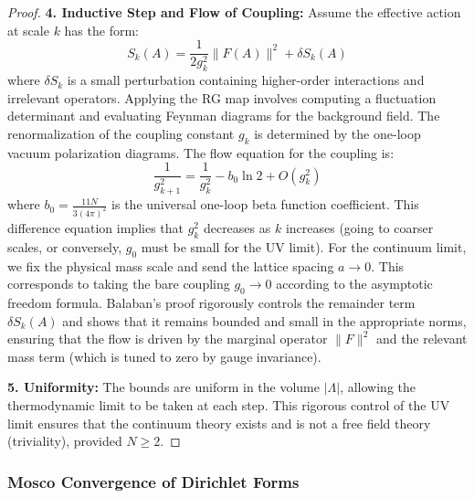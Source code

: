 \begin{proof}
\textbf{4. Inductive Step and Flow of Coupling:}
Assume the effective action at scale $k$ has the form:
\begin{equation}
S_k(A) = \frac{1}{2g_k^2} \|F(A)\|^2 + \delta S_k(A)
\end{equation}
where $\delta S_k$ is a small perturbation containing higher-order interactions and irrelevant operators.
Applying the RG map involves computing a fluctuation determinant and evaluating Feynman diagrams for the background field.
The renormalization of the coupling constant $g_k$ is determined by the one-loop vacuum polarization diagrams.
The flow equation for the coupling is:
\begin{equation}
\frac{1}{g_{k+1}^2} = \frac{1}{g_k^2} - b_0 \ln 2 + O(g_k^2)
\end{equation}
where $b_0 = \frac{11N}{3(4\pi)^2}$ is the universal one-loop beta function coefficient.
This difference equation implies that $g_k^2$ decreases as $k$ increases (going to coarser scales, or conversely, $g_0$ must be small for the UV limit).
For the continuum limit, we fix the physical mass scale and send the lattice spacing $a \to 0$. This corresponds to taking the bare coupling $g_0 \to 0$ according to the asymptotic freedom formula.
Balaban's proof rigorously controls the remainder term $\delta S_k(A)$ and shows that it remains bounded and small in the appropriate norms, ensuring that the flow is driven by the marginal operator $\|F\|^2$ and the relevant mass term (which is tuned to zero by gauge invariance).

\textbf{5. Uniformity:}
The bounds are uniform in the volume $|\Lambda|$, allowing the thermodynamic limit to be taken at each step.
This rigorous control of the UV limit ensures that the continuum theory exists and is not a free field theory (triviality), provided $N \geq 2$.
\end{proof}


\subsubsection{Mosco Convergence of Dirichlet Forms}

